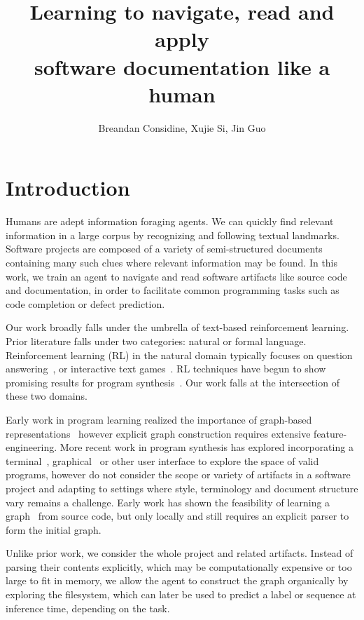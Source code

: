 \documentclass[11pt]{article}
\title{Learning to navigate, read and apply\\software documentation like a human}
\author{Breandan Considine, Xujie Si, Jin Guo}
\begin{document}
\maketitle

\section{Introduction}

Humans are adept information foraging agents. We can quickly find relevant information in a large corpus by recognizing and following textual landmarks. Software projects are composed of a variety of semi-structured documents containing many such clues where relevant information may be found. In this work, we train an agent to navigate and read software artifacts like source code and documentation, in order to facilitate common programming tasks such as code completion or defect prediction.

Our work broadly falls under the umbrella of text-based reinforcement learning. Prior literature falls under two categories: natural or formal language. Reinforcement learning (RL) in the natural domain typically focuses on question answering~\cite{buck2017ask, chen2019reinforcement}, or interactive text games~\cite{he2015deep,ammanabrolu2018playing,narasimhan2015language,guo2020interactive,ammanabrolu2020graph}. RL techniques have begun to show promising results for program synthesis~\cite{ellis2019write, johnson2020learning, chen2020program}. Our work falls at the intersection of these two domains.

Early work in program learning realized the importance of graph-based representations~\cite{allamanis2017learning} however explicit graph construction requires extensive feature-engineering. More recent work in program synthesis has explored incorporating a terminal~\cite{ellis2019write}, graphical~\cite{walke2020learning} or other user interface to explore the space of valid programs, however do not consider the scope or variety of artifacts in a software project and adapting to settings where style, terminology and document structure vary remains a challenge. Early work has shown the feasibility of learning a graph~\cite{johnson2020learning} from source code, but only locally and still requires an explicit parser to form the initial graph.

Unlike prior work, we consider the whole project and related artifacts. Instead of parsing their contents explicitly, which may be computationally expensive or too large to fit in memory, we allow the agent to construct the graph organically by exploring the filesystem, which can later be used to predict a label or sequence at inference time, depending on the task.
\end{document}
